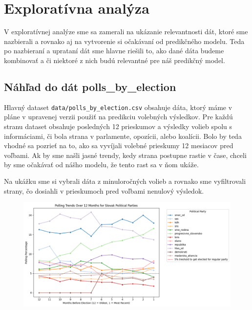 \documentclass[report.tex]{subfiles}
\begin{document}
\section{Exploratívna analýza}
\label{sec:explore}
V exploratívnej analýze sme sa zamerali na ukázanie relevantnosti dát, ktoré sme nazbierali a rovnako aj na vytvorenie si očakávaní od predikčného modelu. Teda po nazbieraní a uprataní dát sme hlavne riešili to, ako dané dáta budeme kombinovať a či niektoré z nich budú relevantné pre náš predikčný model.

\subsection{Náhľad do dát polls\_by\_election}
Hlavný dataset \verb*|data/polls_by_election.csv| obsahuje dáta, ktorý máme v pláne v upravenej verzii použiť na predikciu volebných výsledkov. Pre každú stranu dataset obsahuje posledných 12 prieskumov a výsledky volieb spolu s informáciami, či bola strana v parlamente, opozícii, alebo koalícii. Bolo by teda vhodné sa pozrieť na to, ako sa vyvíjali volebné prieskumy 12 mesiacov pred voľbami. Ak by sme našli jasné trendy, kedy strana postupne rastie v čase, chceli by sme očakávať od nášho modelu, že tento rast sa v ňom ukáže. 

Na ukážku sme si vybrali dáta z minuloročných volieb a rovnako sme vyfiltrovali strany, čo dosiahli v prieskumoch pred voľbami nenulový výsledok. 

\begin{figure}[!htbp]
    \centering
    \includegraphics[width=\textwidth]{images_exploratory/Polls_without_result_2023.png}
    \caption{}
\end{figure}
\end{document}
